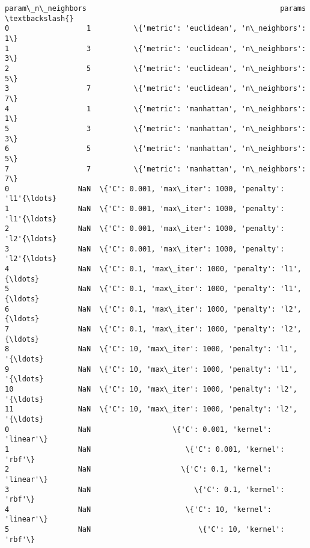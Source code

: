 \documentclass[11pt]{article}
\begin{document}
\begin{tcolorbox}[breakable, size=fbox, boxrule=.5pt, pad at break*=1mm, opacityfill=0]
\begin{Verbatim}[commandchars=\\\{\}]
   param\_n\_neighbors                                             params  \textbackslash{}
0                  1          \{'metric': 'euclidean', 'n\_neighbors': 1\}
1                  3          \{'metric': 'euclidean', 'n\_neighbors': 3\}
2                  5          \{'metric': 'euclidean', 'n\_neighbors': 5\}
3                  7          \{'metric': 'euclidean', 'n\_neighbors': 7\}
4                  1          \{'metric': 'manhattan', 'n\_neighbors': 1\}
5                  3          \{'metric': 'manhattan', 'n\_neighbors': 3\}
6                  5          \{'metric': 'manhattan', 'n\_neighbors': 5\}
7                  7          \{'metric': 'manhattan', 'n\_neighbors': 7\}
0                NaN  \{'C': 0.001, 'max\_iter': 1000, 'penalty': 'l1'{\ldots}
1                NaN  \{'C': 0.001, 'max\_iter': 1000, 'penalty': 'l1'{\ldots}
2                NaN  \{'C': 0.001, 'max\_iter': 1000, 'penalty': 'l2'{\ldots}
3                NaN  \{'C': 0.001, 'max\_iter': 1000, 'penalty': 'l2'{\ldots}
4                NaN  \{'C': 0.1, 'max\_iter': 1000, 'penalty': 'l1', {\ldots}
5                NaN  \{'C': 0.1, 'max\_iter': 1000, 'penalty': 'l1', {\ldots}
6                NaN  \{'C': 0.1, 'max\_iter': 1000, 'penalty': 'l2', {\ldots}
7                NaN  \{'C': 0.1, 'max\_iter': 1000, 'penalty': 'l2', {\ldots}
8                NaN  \{'C': 10, 'max\_iter': 1000, 'penalty': 'l1', '{\ldots}
9                NaN  \{'C': 10, 'max\_iter': 1000, 'penalty': 'l1', '{\ldots}
10               NaN  \{'C': 10, 'max\_iter': 1000, 'penalty': 'l2', '{\ldots}
11               NaN  \{'C': 10, 'max\_iter': 1000, 'penalty': 'l2', '{\ldots}
0                NaN                   \{'C': 0.001, 'kernel': 'linear'\}
1                NaN                      \{'C': 0.001, 'kernel': 'rbf'\}
2                NaN                     \{'C': 0.1, 'kernel': 'linear'\}
3                NaN                        \{'C': 0.1, 'kernel': 'rbf'\}
4                NaN                      \{'C': 10, 'kernel': 'linear'\}
5                NaN                         \{'C': 10, 'kernel': 'rbf'\}


\end{Verbatim}
\end{tcolorbox}
\end{document}
